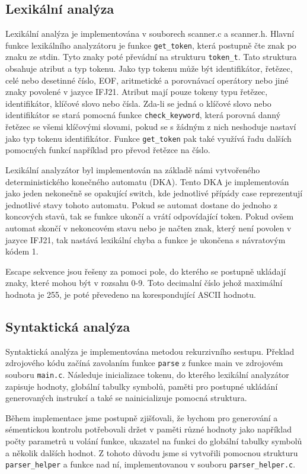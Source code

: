 \documentclass[11pt]{article}
\begin{document}
\subsection{Lexikální analýza}
Lexikální analýza je implementována v souborech scanner.c a scanner.h. Hlavní funkce lexikálního analyzátoru je funkce \texttt{get\_token}, 
která postupně čte znak po znaku ze stdin. Tyto znaky poté převádní na strukturu \texttt{token\_t}. Tato struktura obsahuje atribut a typ tokenu. 
Jako typ tokenu může být identifikátor, řetězec, celé nebo desetinné číslo, EOF, aritmetické a porovnávací operátory nebo jiné znaky povolené v jazyce IFJ21. 
Atribut mají pouze tokeny typu řetězec, identifikátor, klíčové slovo nebo čísla. Zda-li se jedná o klíčové slovo nebo identifikátor
se stará pomocná funkce \texttt{check\_keyword}, která porovná danný řetězec se všemi klíčovými slovami, pokud se s žádným z nich neshoduje nastaví jako typ
tokenu identifikátor. Funkce \texttt{get\_token} pak také využívá řadu dalších pomocných funkcí například pro převod řetězce na číslo.

Lexikální analyzátor byl implementován na základě námi vytvořeného deterministického konečného automatu (DKA).
Tento DKA je implementován jako jeden nekonečně se opakující switch, kde jednotlivé přípády case reprezentují jednotlivé stavy tohoto automatu.
Pokud se automat dostane do jednoho z koncových stavů, tak se funkce ukončí a vrátí odpovídající token. Pokud ovšem
automat skončí v nekoncovém stavu nebo je načten znak, který není povolen v jazyce IFJ21, tak nastává lexikální chyba a funkce je ukončena s návratovým kódem 1.

Escape sekvence jsou řešeny za pomoci pole, do kterého se postupně ukládají znaky, které mohou být v rozsahu 0-9. Toto decimalní číslo jehož maximální
hodnota je 255, je poté převedeno na korespondující ASCII hodnotu. 

\subsection{Syntaktická analýza}
Syntaktická analýza je implementována metodou rekurzivního sestupu. Překlad zdrojového kódu začíná zavolaním funkce 
\texttt{parse} z funkce main ve zdrojovém souboru \texttt{main.c}. Následuje inicializace tokenu, do kterého lexikální analyzátor 
zapisuje hodnoty, globální tabulky symbolů, paměti pro postupné ukládání generovaných instrukcí a také se nainicializuje pomocná struktura. 

Během implementace jsme postupně zjišťovali,
že bychom pro generování a sémentickou kontrolu potřebovali držet v paměti různé hodnoty jako například počty parametrů u volání funkce,
 ukazatel na funkci do globální tabulky symbolů a několik dalších hodnot. Z tohoto důvodu jsme si vytvořili pomocnou strukturu
 \texttt{parser\_helper} a funkce nad ní, implementovanou v souboru \texttt{parser\_helper.c}.
\end{document}
